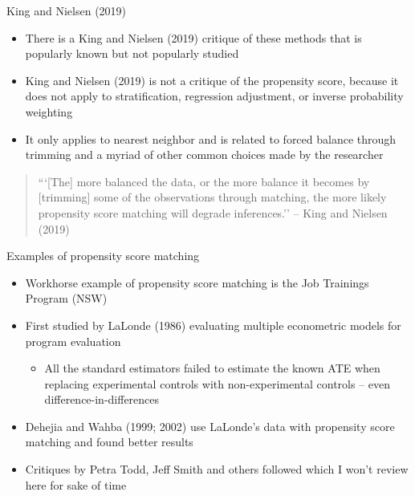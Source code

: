 \documentclass{beamer}
\begin{document}
\begin{frame}{King and Nielsen (2019)}
	
	\begin{itemize}
	\item There is a King and Nielsen (2019) critique of these methods that is popularly known but not popularly studied
	\item King and Nielsen (2019) is not a critique of the propensity score, because it does not apply to stratification, regression adjustment, or inverse probability weighting
	\item It only applies to nearest neighbor and is related to forced balance through trimming and a myriad of other common choices made by the researcher
	\end{itemize}
	
\end{frame}

\begin{frame}[plain]

\begin{quote}
	

```[The] more balanced the data, or the more balance it becomes by [trimming] some of the observations through matching, the more likely propensity score matching will degrade inferences.'' -- King and Nielsen (2019)

\end{quote}
	
\end{frame}


\begin{frame}{Examples of propensity score matching}
	
	\begin{itemize}
	\item Workhorse example of propensity score matching is the Job Trainings Program (NSW) 
	\item First studied by LaLonde (1986) evaluating multiple econometric models for program evaluation 
		\begin{itemize}
		\item All the standard estimators failed to estimate the known ATE when replacing experimental controls with non-experimental controls -- even difference-in-differences
		\end{itemize}
	\item Dehejia and Wahba (1999; 2002) use LaLonde's data with propensity score matching and found better results
	\item Critiques by Petra Todd, Jeff Smith and others followed which I won't review here for sake of time
	\end{itemize}
\end{frame}
\end{document}
